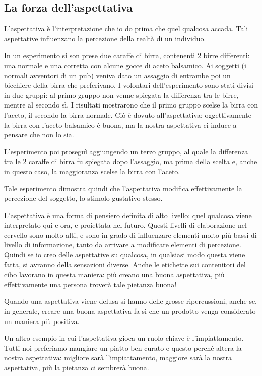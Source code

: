 \subsection{La forza dell'aspettativa}

L'aspettativa è l'interpretazione che io do prima che quel qualcosa accada.
Tali aspettative influenzano la percezione della realtà di un individuo.

In un esperimento si son prese due caraffe di birra, contenenti 2 birre
differenti: una normale e una corretta con alcune gocce di aceto balsamico.
Ai soggetti (i normali avventori di un pub) veniva dato un assaggio di entrambe
poi un bicchiere della birra che preferivano.
I volontari dell'esperimento sono stati divisi in due gruppi: al primo gruppo
non venne spiegata la differenza tra le birre, mentre al secondo sì. I
risultati mostrarono che il primo gruppo scelse la birra con l'aceto, il
secondo la birra normale. Ciò è dovuto all'aspettativa: oggettivamente la birra
con l'aceto balsamico è buona, ma la nostra aspettativa ci induce a pensare che
non lo sia.

L'esperimento poi proseguì aggiungendo un terzo gruppo, al quale la
differenza tra le 2 caraffe di birra fu spiegata dopo l'assaggio, ma
prima della scelta e, anche in questo caso, la maggioranza scelse la birra
con l'aceto.

Tale esperimento dimostra quindi che l'aspettativa modifica
effettivamente la percezione del soggetto, lo stimolo gustativo stesso.

L'aspettativa è una forma di pensiero definita di alto livello: quel qualcosa
viene interpretato qui e ora, e proiettata nel futuro. Questi livelli di
elaborazione nel cervello sono molto alti, e sono in grado di influenzare
elementi molto più bassi di livello di informazione, tanto da arrivare a
modificare elementi di percezione. Quindi se io creo delle aspettative su
qualcosa, in qualsiasi modo questa viene fatta, si avranno della sensazioni
diverse. Anche le etichette sui contenitori del cibo lavorano in questa
maniera: più creano una buona aspettativa, più effettivamente una persona
troverà tale pietanza buona!

Quando una aspettativa viene delusa si hanno delle grosse ripercussioni, anche
se, in generale, creare una buona aspettativa fa sì che un prodotto venga
considerato un maniera più positiva.

Un altro esempio in cui l'aspettativa gioca un ruolo chiave è l'impiattamento.
Tutti noi preferiamo mangiare un piatto ben curato e questo perché altera la
nostra aspettativa: migliore sarà l'impiattamento, maggiore sarà la nostra
aspettativa, più la pietanza ci sembrerà buona.

